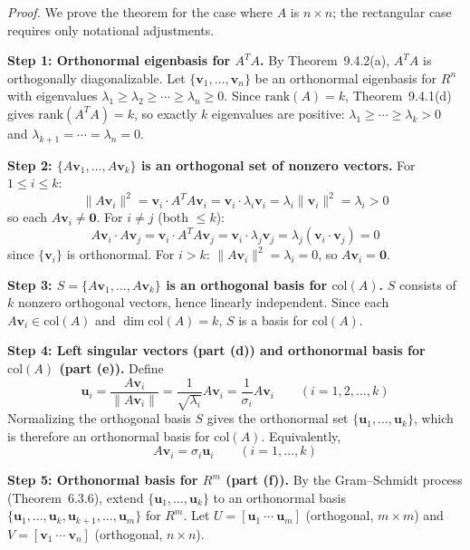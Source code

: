 \documentclass{article}
\begin{document}
\textit{Proof.}
We prove the theorem for the case where $A$ is $n\times n$; the rectangular case requires
only notational adjustments.

\textbf{Step 1: Orthonormal eigenbasis for $A^TA$.}
By Theorem~9.4.2(a), $A^TA$ is orthogonally diagonalizable. Let
$\{\mathbf{v}_1,\ldots,\mathbf{v}_n\}$ be an orthonormal eigenbasis for $R^n$ with
eigenvalues $\lambda_1\ge\lambda_2\ge\cdots\ge\lambda_n\ge 0$. Since $\mathrm{rank}(A)=k$,
Theorem~9.4.1(d) gives $\mathrm{rank}(A^TA)=k$, so exactly $k$ eigenvalues are positive:
$\lambda_1\ge\cdots\ge\lambda_k>0$ and $\lambda_{k+1}=\cdots=\lambda_n=0$.

\textbf{Step 2: $\{A\mathbf{v}_1,\ldots,A\mathbf{v}_k\}$ is an orthogonal set of nonzero
vectors.}
For $1\le i\le k$:
\[
  \|A\mathbf{v}_i\|^2 = \mathbf{v}_i\cdot A^TA\mathbf{v}_i
  = \mathbf{v}_i\cdot\lambda_i\mathbf{v}_i = \lambda_i\|\mathbf{v}_i\|^2 = \lambda_i > 0
\]
so each $A\mathbf{v}_i\ne\mathbf{0}$. For $i\ne j$ (both $\le k$):
\[
  A\mathbf{v}_i\cdot A\mathbf{v}_j = \mathbf{v}_i\cdot A^TA\mathbf{v}_j
  = \mathbf{v}_i\cdot\lambda_j\mathbf{v}_j = \lambda_j(\mathbf{v}_i\cdot\mathbf{v}_j) = 0
\]
since $\{\mathbf{v}_i\}$ is orthonormal. For $i>k$: $\|A\mathbf{v}_i\|^2=\lambda_i=0$,
so $A\mathbf{v}_i=\mathbf{0}$.

\textbf{Step 3: $S=\{A\mathbf{v}_1,\ldots,A\mathbf{v}_k\}$ is an orthogonal basis for
$\mathrm{col}(A)$.}
$S$ consists of $k$ nonzero orthogonal vectors, hence linearly independent. Since each
$A\mathbf{v}_i\in\mathrm{col}(A)$ and $\dim\mathrm{col}(A)=k$, $S$ is a basis for
$\mathrm{col}(A)$.

\textbf{Step 4: Left singular vectors (part (d)) and orthonormal basis for $\mathrm{col}(A)$
(part (e)).}
Define
\[
  \mathbf{u}_i = \frac{A\mathbf{v}_i}{\|A\mathbf{v}_i\|} = \frac{1}{\sqrt{\lambda_i}}A\mathbf{v}_i
  = \frac{1}{\sigma_i}A\mathbf{v}_i \qquad (i=1,2,\ldots,k)
\]
Normalizing the orthogonal basis $S$ gives the orthonormal set
$\{\mathbf{u}_1,\ldots,\mathbf{u}_k\}$, which is therefore an orthonormal basis for
$\mathrm{col}(A)$. Equivalently,
\begin{equation}
  A\mathbf{v}_i = \sigma_i\mathbf{u}_i \qquad (i=1,\ldots,k) \tag{4}
\end{equation}

\textbf{Step 5: Orthonormal basis for $R^m$ (part (f)).}
By the Gram--Schmidt process (Theorem~6.3.6), extend
$\{\mathbf{u}_1,\ldots,\mathbf{u}_k\}$ to an orthonormal basis
$\{\mathbf{u}_1,\ldots,\mathbf{u}_k,\mathbf{u}_{k+1},\ldots,\mathbf{u}_m\}$ for $R^m$.
Let $U = [\mathbf{u}_1\ \cdots\ \mathbf{u}_m]$ (orthogonal, $m\times m$) and
$V = [\mathbf{v}_1\ \cdots\ \mathbf{v}_n]$ (orthogonal, $n\times n$).
\end{document}
